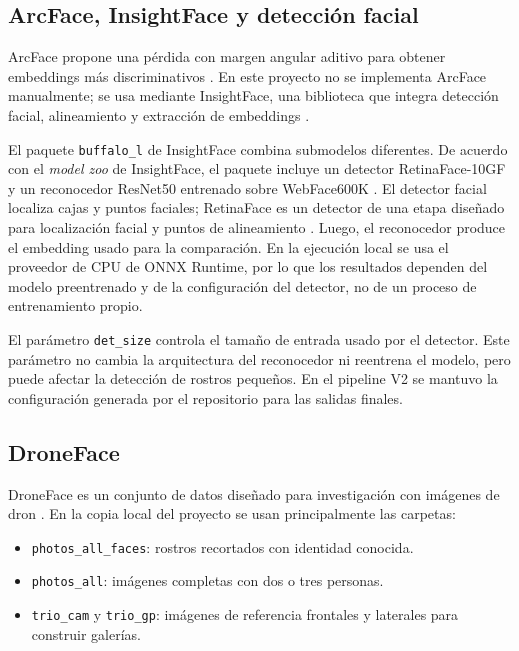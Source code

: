 \documentclass[11pt]{article}
\newcommand{\detectorinput}{\texttt{det\_size}}
\begin{document}
\subsection{ArcFace, InsightFace y detecci\'on facial}

ArcFace propone una p\'erdida con margen angular aditivo para obtener embeddings m\'as discriminativos \cite{deng2019arcface}. En este proyecto no se implementa ArcFace manualmente; se usa mediante InsightFace, una biblioteca que integra detecci\'on facial, alineamiento y extracci\'on de embeddings \cite{insightface2026}.

El paquete \texttt{buffalo\_l} de InsightFace combina submodelos diferentes. De acuerdo con el \textit{model zoo} de InsightFace, el paquete incluye un detector RetinaFace-10GF y un reconocedor ResNet50 entrenado sobre WebFace600K \cite{insightface_model_zoo}. El detector facial localiza cajas y puntos faciales; RetinaFace es un detector de una etapa dise\~nado para localizaci\'on facial y puntos de alineamiento \cite{deng2020retinaface}. Luego, el reconocedor produce el embedding usado para la comparaci\'on. En la ejecuci\'on local se usa el proveedor de CPU de ONNX Runtime, por lo que los resultados dependen del modelo preentrenado y de la configuraci\'on del detector, no de un proceso de entrenamiento propio.

El par\'ametro \detectorinput{} controla el tama\~no de entrada usado por el detector. Este par\'ametro no cambia la arquitectura del reconocedor ni reentrena el modelo, pero puede afectar la detecci\'on de rostros peque\~nos. En el pipeline V2 se mantuvo la configuraci\'on generada por el repositorio para las salidas finales.

\subsection{DroneFace}

DroneFace es un conjunto de datos dise\~nado para investigaci\'on con im\'agenes de dron \cite{hsu2017droneface}. En la copia local del proyecto se usan principalmente las carpetas:

\begin{itemize}
    \item \texttt{photos\_all\_faces}: rostros recortados con identidad conocida.
    \item \texttt{photos\_all}: im\'agenes completas con dos o tres personas.
    \item \texttt{trio\_cam} y \texttt{trio\_gp}: im\'agenes de referencia frontales y laterales para construir galer\'ias.
\end{itemize}
\end{document}
